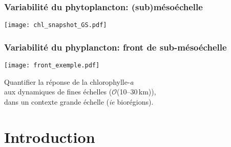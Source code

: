 \documentclass[11pt, french, aspectratio=32]{beamer}
\begin{document}

\begin{frame}
  \frametitle{Variabilité du phytoplancton: (sub)mésoéchelle}
    \texttt{[image: chl\_snapshot\_GS.pdf]}
    \\
\end{frame}



\begin{frame}
  \frametitle{Variabilité du phyplancton: front de sub-mésoéchelle}

  \texttt{[image: front\_exemple.pdf]}
  \\

\end{frame}


\begin{frame}


  \vspace{3em}

  {
    \centering
    \begin{onehalfspacing}
      Quantifier la réponse de la chlorophylle-\textit{a}
      \\aux dynamiques de fines échelles (\(\mathcal{O}\)(10--30\,km)),
      \\dans un contexte grande échelle (\textit{ie} biorégions).
      \\
    \end{onehalfspacing}
  }
\end{frame}


\section*{Introduction}


\end{document}

